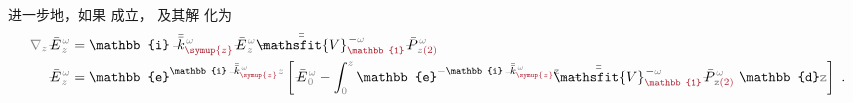 进一步地，如果  成立， 及其解  化为
\begin{subequations}
\begin{align}
	\mathcolor{gray}{\nabla_z} \xint{\mathcolor{gray}{-}}{295}{\bar{E}}^{\;\!\mathcolor{gray}{\omega}}_{\;\! \mathcolor{gray}{z}}
	&= \mathbb{i} \xint{\begin{smallmatrix} ~ \\ {}^{}_{\mathcolor{gray}{-}} \\ ~ \end{smallmatrix}}{15}{\bar{\bar{k}}}_{\textcolor{Maroon}{\symup{z}}}^{\;\! \mathcolor{gray}{\omega}} \xint{\mathcolor{gray}{-}}{295}{\bar{E}}^{\;\!\mathcolor{gray}{\omega}}_{\;\! \mathcolor{gray}{z}} - \xint{\mathcolor{gray}{-}}{25}{\bar{\bar{\mathsfit{V}}}}^{\;\! - \mathcolor{gray}{\omega}}_{\textcolor{Maroon}{\mathbb{1}}} \xint{\mathcolor{gray}{-}}{30}{\bar{P}}^{\;\! \mathcolor{gray}{\omega}}_{\;\! \mathcolor{gray}{z} \textcolor{Maroon}{(2)}} \label{eq:simplify6-LE0-SVA-E'-V_1nonsingular} \\
	\xint{\mathcolor{gray}{-}}{295}{\bar{E}}^{\;\!\mathcolor{gray}{\omega}}_{\;\! \mathcolor{gray}{z}}
	&= \mathbb{e}^{\mathbb{i} \xint{\begin{smallmatrix} ~ \\ {}^{}_{\mathcolor{gray}{-}} \\ ~ \end{smallmatrix}}{15}{\bar{\bar{k}}}_{\textcolor{Maroon}{\symup{z}}}^{\;\! \mathcolor{gray}{\omega}} \mathcolor{gray}{z}} \left[ \xint{\mathcolor{gray}{-}}{295}{\bar{E}}^{\;\!\mathcolor{gray}{\omega}}_{\;\! \mathcolor{gray}{0}} - \int_{\mathcolor{gray}{0}}^{\mathcolor{gray}{z}} \mathbb{e}^{- \mathbb{i} \xint{\begin{smallmatrix} ~ \\ {}^{}_{\mathcolor{gray}{-}} \\ ~ \end{smallmatrix}}{15}{\bar{\bar{k}}}_{\textcolor{Maroon}{\symup{z}}}^{\;\! \mathcolor{gray}{\omega}} \mathcolor{gray}{\mathtt{z}}} \cdot \xint{\mathcolor{gray}{-}}{25}{\bar{\bar{\mathsfit{V}}}}^{\;\! - \mathcolor{gray}{\omega}}_{\textcolor{Maroon}{\mathbb{1}}} \xint{\mathcolor{gray}{-}}{30}{\bar{P}}^{\;\! \mathcolor{gray}{\omega}}_{\;\! \mathcolor{gray}{\mathtt{z}} \textcolor{Maroon}{(2)}} ~\mathbb{d} \mathcolor{gray}{\mathtt{z}} \right] ~. \label{eq:simplify6-LE0-SVA-E'-V_1nonsingular-solution}
\end{align}
\end{subequations}
